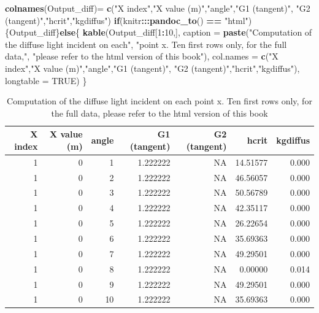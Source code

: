\documentclass[]{book}
\newenvironment{Shaded}{\begin{snugshade}}{\end{snugshade}}
\newcommand{\KeywordTok}[1]{\textcolor[rgb]{0.13,0.29,0.53}{\textbf{#1}}}
\newcommand{\DataTypeTok}[1]{\textcolor[rgb]{0.13,0.29,0.53}{#1}}
\newcommand{\DecValTok}[1]{\textcolor[rgb]{0.00,0.00,0.81}{#1}}
\newcommand{\StringTok}[1]{\textcolor[rgb]{0.31,0.60,0.02}{#1}}
\newcommand{\OtherTok}[1]{\textcolor[rgb]{0.56,0.35,0.01}{#1}}
\newcommand{\ControlFlowTok}[1]{\textcolor[rgb]{0.13,0.29,0.53}{\textbf{#1}}}
\newcommand{\OperatorTok}[1]{\textcolor[rgb]{0.81,0.36,0.00}{\textbf{#1}}}
\newcommand{\NormalTok}[1]{#1}
\theoremstyle{definition}
\theoremstyle{definition}
\theoremstyle{definition}
\theoremstyle{remark}
\begin{document}
\begin{Shaded}
\begin{Highlighting}[]
\KeywordTok{colnames}\NormalTok{(Output_diff)=}\StringTok{ }\KeywordTok{c}\NormalTok{(}\StringTok{"X index"}\NormalTok{,}\StringTok{"X value (m)"}\NormalTok{,}\StringTok{"angle"}\NormalTok{,}\StringTok{"G1 (tangent)"}\NormalTok{,}
                         \StringTok{"G2 (tangent)"}\NormalTok{,}\StringTok{"hcrit"}\NormalTok{,}\StringTok{"kgdiffus"}\NormalTok{)}
\ControlFlowTok{if}\NormalTok{(knitr}\OperatorTok{:::}\KeywordTok{pandoc_to}\NormalTok{() }\OperatorTok{==}\StringTok{ "html"}\NormalTok{) \{Output_diff\}}\ControlFlowTok{else}\NormalTok{\{}
  \KeywordTok{kable}\NormalTok{(Output_diff[}\DecValTok{1}\OperatorTok{:}\DecValTok{10}\NormalTok{,],}
        \DataTypeTok{caption =} \KeywordTok{paste}\NormalTok{(}\StringTok{"Computation of the diffuse light incident on each"}\NormalTok{,}
                        \StringTok{"point x. Ten first rows only, for the full data,"}\NormalTok{,}
                        \StringTok{"please refer to the html version of this book"}\NormalTok{),}
        \DataTypeTok{col.names =} \KeywordTok{c}\NormalTok{(}\StringTok{"X index"}\NormalTok{,}\StringTok{"X value (m)"}\NormalTok{,}\StringTok{"angle"}\NormalTok{,}\StringTok{"G1 (tangent)"}\NormalTok{,}
                      \StringTok{"G2 (tangent)"}\NormalTok{,}\StringTok{"hcrit"}\NormalTok{,}\StringTok{"kgdiffus"}\NormalTok{), }\DataTypeTok{longtable =} \OtherTok{TRUE}\NormalTok{)}
\NormalTok{\}}
\end{Highlighting}
\end{Shaded}

\begin{longtable}[t]{r|r|r|r|r|r|r}
\caption{\label{tab:kdiff}Computation of the diffuse light incident on each point x. Ten first rows only, for the full data, please refer to the html version of this book}\\
\hline
X index & X value (m) & angle & G1 (tangent) & G2 (tangent) & hcrit & kgdiffus\\
\hline
1 & 0 & 1 & 1.222222 & NA & 14.51577 & 0.000\\
\hline
1 & 0 & 2 & 1.222222 & NA & 46.56057 & 0.000\\
\hline
1 & 0 & 3 & 1.222222 & NA & 50.56789 & 0.000\\
\hline
1 & 0 & 4 & 1.222222 & NA & 42.35117 & 0.000\\
\hline
1 & 0 & 5 & 1.222222 & NA & 26.22654 & 0.000\\
\hline
1 & 0 & 6 & 1.222222 & NA & 35.69363 & 0.000\\
\hline
1 & 0 & 7 & 1.222222 & NA & 49.29501 & 0.000\\
\hline
1 & 0 & 8 & 1.222222 & NA & 0.00000 & 0.014\\
\hline
1 & 0 & 9 & 1.222222 & NA & 49.29501 & 0.000\\
\hline
1 & 0 & 10 & 1.222222 & NA & 35.69363 & 0.000\\
\hline
\end{longtable}
\end{document}
